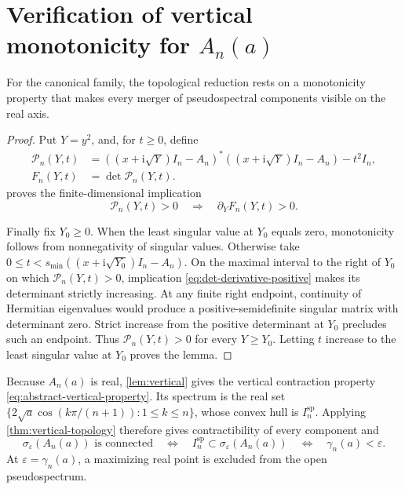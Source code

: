 \documentclass[10pt,twoside]{siamart1116}
\numberwithin{equation}{section}
\newcommand{\ii}{\mathrm i}
\begin{document}
\section{Verification of vertical monotonicity for
\texorpdfstring{\(A_n(a)\)}{A\string_n(a)}}
\label{sec:vertical}

For the canonical family, the topological reduction rests on a monotonicity
property that makes every merger of pseudospectral components visible on the
real axis.


\begin{proof}
Put \(Y=y^2\), and, for \(t\geq0\), define
\[
 \begin{aligned}
 \mathcal P_n(Y,t)
 &=((x+\ii\sqrt Y)I_n-A_n)^*
   ((x+\ii\sqrt Y)I_n-A_n)-t^2I_n,\\
 F_n(Y,t)&=\det \mathcal P_n(Y,t).
 \end{aligned}
\]
 proves the finite-dimensional
implication
\begin{equation}\label{eq:det-derivative-positive}
 \mathcal P_n(Y,t)>0\quad\Longrightarrow\quad
 \partial_YF_n(Y,t)>0.
\end{equation}

Finally fix \(Y_0\geq0\).  When the least singular value at \(Y_0\) equals
zero, monotonicity follows from nonnegativity of singular values.  Otherwise
take \(0\leq t<s_{\min}((x+\ii\sqrt{Y_0})I_n-A_n)\).  On the maximal interval
to the right of \(Y_0\) on which \(\mathcal P_n(Y,t)>0\), implication
\eqref{eq:det-derivative-positive} makes its determinant strictly increasing.
At any finite right endpoint, continuity of Hermitian eigenvalues would
produce a positive-semidefinite singular matrix with determinant zero.
Strict increase from the positive determinant at \(Y_0\) precludes such an
endpoint.
Thus \(\mathcal P_n(Y,t)>0\) for every \(Y\geq Y_0\).  Letting \(t\) increase to
the least singular value at \(Y_0\) proves the lemma.
\end{proof}

Because \(A_n(a)\) is real, \cref{lem:vertical} gives the vertical
contraction property \eqref{eq:abstract-vertical-property}.  Its spectrum is
the real set
\(\{2\sqrt a\cos(k\pi/(n+1)):1\leq k\leq n\}\), whose convex hull is
\(I_n^{\mathrm{sp}}\).  Applying \cref{thm:vertical-topology} therefore
gives contractibility of every component and
\begin{equation}\label{eq:connected-iff-gamma}
 \sigma_\varepsilon(A_n(a))\text{ is connected}
 \quad\Longleftrightarrow\quad
 I_n^{\mathrm{sp}}\subset\sigma_\varepsilon(A_n(a))
 \quad\Longleftrightarrow\quad
 \gamma_n(a)<\varepsilon.
\end{equation}
At \(\varepsilon=\gamma_n(a)\), a maximizing real point is excluded from the
open pseudospectrum.
\end{document}
